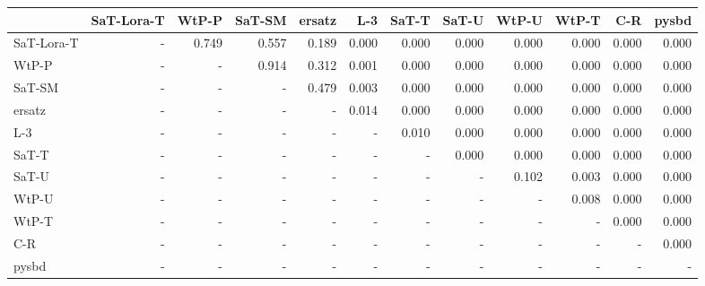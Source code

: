 \begin{tabular}{lrrrrrrrrrrr}
\toprule
 & SaT-Lora-T & WtP-P & SaT-SM & ersatz & L-3 & SaT-T & SaT-U & WtP-U & WtP-T & C-R & pysbd \\
\midrule
SaT-Lora-T & - & 0.749 & 0.557 & 0.189 & 0.000 & 0.000 & 0.000 & 0.000 & 0.000 & 0.000 & 0.000 \\
WtP-P & - & - & 0.914 & 0.312 & 0.001 & 0.000 & 0.000 & 0.000 & 0.000 & 0.000 & 0.000 \\
SaT-SM & - & - & - & 0.479 & 0.003 & 0.000 & 0.000 & 0.000 & 0.000 & 0.000 & 0.000 \\
ersatz & - & - & - & - & 0.014 & 0.000 & 0.000 & 0.000 & 0.000 & 0.000 & 0.000 \\
L-3 & - & - & - & - & - & 0.010 & 0.000 & 0.000 & 0.000 & 0.000 & 0.000 \\
SaT-T & - & - & - & - & - & - & 0.000 & 0.000 & 0.000 & 0.000 & 0.000 \\
SaT-U & - & - & - & - & - & - & - & 0.102 & 0.003 & 0.000 & 0.000 \\
WtP-U & - & - & - & - & - & - & - & - & 0.008 & 0.000 & 0.000 \\
WtP-T & - & - & - & - & - & - & - & - & - & 0.000 & 0.000 \\
C-R & - & - & - & - & - & - & - & - & - & - & 0.000 \\
pysbd & - & - & - & - & - & - & - & - & - & - & - \\
\bottomrule
\end{tabular}

